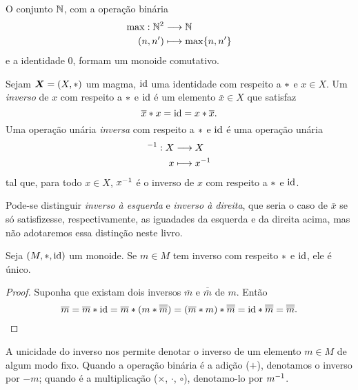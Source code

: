 \begin{ex}
O conjunto $\mathbb{N}$, com a operação binária
	\begin{align*}
	{\max}: {\mathbb{N}^2} &\longrightarrow {\mathbb{N}} \\{(n,n')} &\longmapsto {\max\{n,n'\}}
	\end{align*}
e a identidade $0$, formam um monoide comutativo.
\end{ex}

\begin{defi}[Inverso]
Sejam $\bm X = (X, \ast )$ um magma, $\mathrm{id}$ uma identidade com respeito a $\ast$ e $x \in X$. Um \emph{inverso} de $x$ com respeito a $\ast$ e $\mathrm{id}$ é um elemento $\bar x \in X$ que satisfaz
	\begin{equation*}
	\overline x \ast x = \mathrm{id} =  x \ast \overline x.
	\end{equation*}
Uma operação unária \emph{inversa} com respeito a $\ast$ e $\mathrm{id}$ é uma operação unária
	\begin{align*}
	{^{-1}}: {X} &\longrightarrow {X} \\{x} &\longmapsto {x^{-1}}
	\end{align*}
tal que, para todo $x \in X$, $x ^{-1}$ é o inverso de $x$ com respeito a $\ast$ e $\mathrm{id}$.
\end{defi}

Pode-se distinguir \emph{inverso à esquerda} e \emph{inverso à direita}, que seria o caso de $\bar x$ se só satisfizesse, respectivamente, as iguadades da esquerda e da direita acima, mas não adotaremos essa distinção neste livro.

\begin{prop}
\label{prop:unic.inv}
Seja $(M,\ast,\mathrm{id})$ um monoide. Se $m \in M$ tem inverso com respeito $\ast$ e $\mathrm{id}$, ele é único.
\end{prop}
\begin{proof}
Suponha que existam dois inversos $\overline m$ e $\overline{\overline m}$ de $m$. Então
	\begin{equation*}
	\overline m = \overline m \ast \mathrm{id} = \overline m \ast (m \ast \overline{\overline m}) = (\overline m \ast m) \ast \overline{\overline m} = \mathrm{id} \ast \overline{\overline m} = \overline{\overline m}. \qedhere
	\end{equation*}
\end{proof}

\begin{nota}
A unicidade do inverso nos permite denotar o inverso de um elemento $m \in M$ de algum modo fixo. Quando a operação binária é a adição ($+$), denotamos o inverso por $-m$; quando é a multiplicação ($\times$, $\cdot$, $\circ$), denotamo-lo por $m^{-1}$.
\end{nota}

